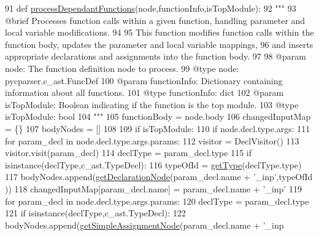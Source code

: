 \begin{DoxyCode}
91 \textcolor{keyword}{def }\hyperlink{namespaceutils_a6c1d5e886507ec0741fb0fce3f642c5b}{processDependantFunctions}(node,functionInfo,isTopModule):
92     \textcolor{stringliteral}{"""
}
93 \textcolor{stringliteral}{    @brief Processes function calls within a given function, handling parameter and local variable
       modifications.
}
94 \textcolor{stringliteral}{
}
95 \textcolor{stringliteral}{    This function modifies function calls within the function body, updates the parameter and local
       variable mappings,
}
96 \textcolor{stringliteral}{    and inserts appropriate declarations and assignments into the function body.
}
97 \textcolor{stringliteral}{
}
98 \textcolor{stringliteral}{    @param node: The function definition node to process.
}
99 \textcolor{stringliteral}{    @type node: pycparser.c\_ast.FuncDef
}
100 \textcolor{stringliteral}{    @param functionInfo: Dictionary containing information about all functions.
}
101 \textcolor{stringliteral}{    @type functionInfo: dict
}
102 \textcolor{stringliteral}{    @param isTopModule: Boolean indicating if the function is the top module.
}
103 \textcolor{stringliteral}{    @type isTopModule: bool
}
104 \textcolor{stringliteral}{    """}
105     functionBody = node.body
106     changedInputMap = \{\}
107     bodyNodes = []
108 
109     \textcolor{keywordflow}{if} isTopModule:
110         \textcolor{keywordflow}{if} node.decl.type.args:
111             \textcolor{keywordflow}{for} param\_decl \textcolor{keywordflow}{in} node.decl.type.args.params:
112                 visitor = DeclVisitor()
113                 visitor.visit(param\_decl)
114                 declType = param\_decl.type
115                 \textcolor{keywordflow}{if} isinstance(declType,c\_ast.TypeDecl):
116                     typeOfId = \hyperlink{namespaceutils_a63a441384eb62bbf51329ab7e1b212a6}{getType}(declType.type)
117                     bodyNodes.append(\hyperlink{namespaceastNodes_ae5e5c7f09a1586002b20db6d72f6d30b}{getDeclarationNode}(param\_decl.name + \textcolor{stringliteral}{'\_inp'},typeOfId
      ))
118                     changedInputMap[param\_decl.name] = param\_decl.name + \textcolor{stringliteral}{'\_inp'}
119             \textcolor{keywordflow}{for} param\_decl \textcolor{keywordflow}{in} node.decl.type.args.params:
120                 declType = param\_decl.type
121                 \textcolor{keywordflow}{if} isinstance(declType,c\_ast.TypeDecl):
122                     bodyNodes.append(\hyperlink{namespaceastNodes_a2403f5d006e54f20e614226280cb6cbc}{getSimpleAssignmentNode}(param\_decl.name + \textcolor{stringliteral}{'\_inp
}
\end{DoxyCode}
